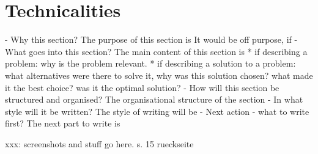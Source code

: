 
\chapter{Technicalities}
\label{chap:app:technicalities}

- Why this section? 
  The purpose of this section is 
  It would be off purpose, if 
- What goes into this section?
  The main content of this section is 
  * if describing a problem: why is the problem relevant.
  * if describing a solution to a problem: what alternatives were
    there to solve it, why was this solution chosen? 
    what made it the best choice? was it the optimal solution?
- How will this section be structured and organised?
  The organisational structure of the section 
- In what style will it be written?
  The style of writing will be 
- Next action - what to write first?
  The next part to write is


xxx: screenshots and stuff go here.
s. 15 rueckseite

